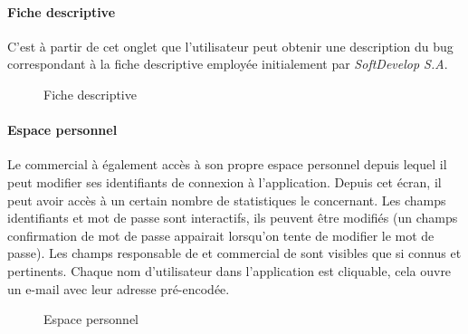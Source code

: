 \documentclass{article}[12pt]
\begin{document}
 \paragraph{Fiche descriptive}
C'est à partir de cet onglet que l'utilisateur peut obtenir une description du bug correspondant à la fiche descriptive employée initialement par \textit{SoftDevelop S.A}.

\begin{figure}[H]
	\centering
	\caption{Fiche descriptive}
\end{figure}
 
 \paragraph{Espace personnel}
 Le commercial à également accès à son propre espace personnel depuis lequel il peut modifier ses identifiants de connexion à l'application. Depuis cet écran, il peut avoir accès à un certain nombre de statistiques le concernant. Les champs identifiants et mot de passe sont interactifs, ils peuvent être modifiés (un champs confirmation de mot de passe appairait lorsqu'on tente de modifier le mot de passe). Les champs \og responsable de \fg et \og commercial de \fg sont visibles que si connus et pertinents. Chaque nom d'utilisateur dans l'application est cliquable, cela ouvre un e-mail avec leur adresse pré-encodée.
\begin{figure}[H]
	\centering
	\caption{Espace personnel}
\end{figure}
\newpage
\end{document}
